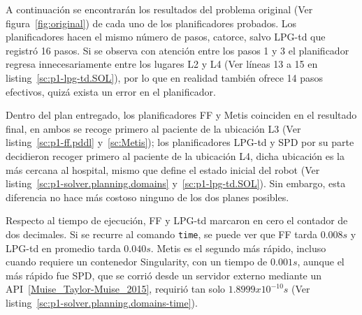 \documentclass[a4paper,12pt]{article}
\begin{document}
A continuación se encontrarán los resultados del problema original (Ver figura~\ref{fig:original}) de cada uno de los planificadores probados. Los planificadores hacen el mismo número de pasos, catorce, salvo LPG-td que registró 16 pasos. Si se observa con atención entre los pasos 1 y 3 el planificador regresa innecesariamente entre los lugares L2 y L4 (Ver líneas 13 a 15 en listing~\ref{sc:p1-lpg-td.SOL}), por lo que en realidad también ofrece 14 pasos efectivos, quizá exista un error en el planificador.

Dentro del plan entregado, los planificadores FF y Metis coinciden en el resultado final, en ambos se recoge primero al paciente de la ubicación L3 (Ver listing~\ref{sc:p1-ff.pddl} y~\ref{sc:Metis}); los planificadores LPG-td y SPD por su parte decidieron recoger primero al paciente de la ubicación L4, dicha ubicación es la más cercana al hospital, mismo que define el estado inicial del robot (Ver listing~\ref{sc:p1-solver.planning.domains} y~\ref{sc:p1-lpg-td.SOL}). Sin embargo, esta diferencia no hace más costoso ninguno de los dos planes posibles.

Respecto al tiempo de ejecución, FF y LPG-td marcaron en cero el contador de dos decimales. Si se recurre al comando \texttt{time}, se puede ver que FF tarda $0.008 s$ y LPG-td en promedio tarda $0.040 s$. Metis es el segundo más rápido, incluso cuando requiere un contenedor Singularity, con un tiempo de $0.001 s$, aunque el más rápido fue SPD, que se corrió desde un servidor externo mediante un API~\ref{Muise_Taylor-Muise_2015}, requirió tan solo $1.8999 x 10^{-10} s$ (Ver listing~\ref{sc:p1-solver.planning.domains-time}).
\end{document}
